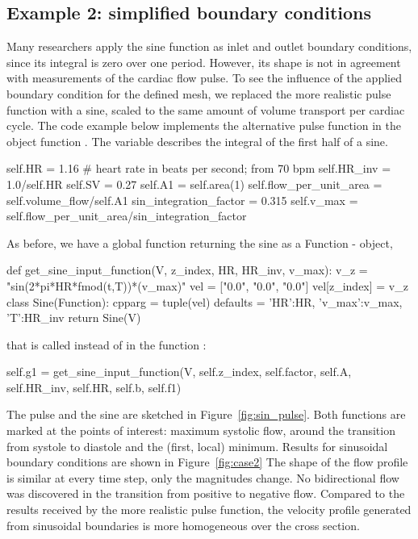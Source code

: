 \subsection{Example 2: simplified boundary conditions}

Many researchers apply the sine function as inlet and outlet boundary
conditions, since its integral is zero over one period. However, its
shape is not in agreement with measurements of the cardiac flow
pulse. To see the influence of the applied boundary condition for the
defined mesh, we replaced the more realistic pulse function with a
sine, scaled to the same amount of volume transport per cardiac
cycle. The code example below implements the alternative pulse
function in the object function . The
variable  describes the integral of the
first half of a sine.
\begin{python}
self.HR = 1.16 # heart rate in beats per second; from 70 bpm
self.HR_inv = 1.0/self.HR
self.SV = 0.27
self.A1 = self.area(1)
self.flow_per_unit_area = self.volume_flow/self.A1
sin_integration_factor = 0.315
self.v_max = self.flow_per_unit_area/sin_integration_factor
\end{python}
As before, we have a global function returning the sine as a Function - object,
\begin{python}
def get_sine_input_function(V, z_index, HR, HR_inv, v_max):
	v_z = "sin(2*pi*HR*fmod(t,T))*(v_max)"
	vel = ["0.0", "0.0", "0.0"]
	vel[z_index] = v_z
	class Sine(Function):
		cpparg = tuple(vel)
		defaults = {'HR':HR, 'v_max':v_max, 'T':HR_inv}
	return Sine(V)
\end{python}
that is called instead of  in the function :
\begin{python}
self.g1 = get_sine_input_function(V, self.z_index, self.factor, self.A, self.HR_inv, self.HR, self.b, self.f1)
\end{python}

The pulse and the sine are sketched in
Figure~\ref{fig:sin_pulse}. Both functions are marked at the points of
interest: maximum systolic flow, around the transition from systole to
diastole and the (first, local) minimum. Results for sinusoidal
boundary conditions are shown in Figure~\ref{fig:case2} The shape of
the flow profile is similar at every time step, only the magnitudes
change. No bidirectional flow was discovered in the transition from
positive to negative flow. Compared to the results received by the
more realistic pulse function, the velocity profile generated from
sinusoidal boundaries is more homogeneous over the cross section.

